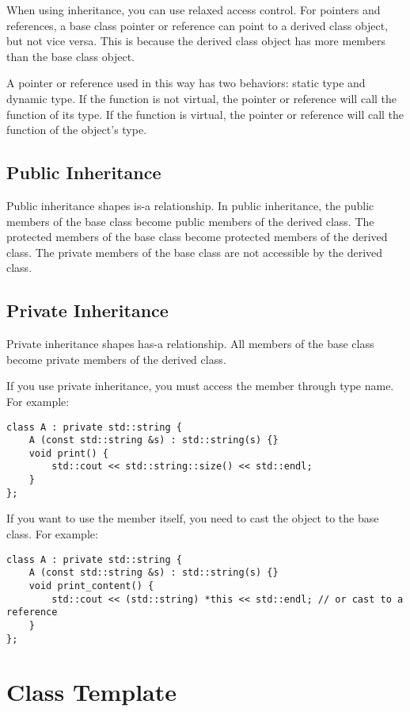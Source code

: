 \documentclass[a4paper,12pt]{article}
\begin{document}
When using inheritance, you can use relaxed access control.
For pointers and references, a base class pointer or reference can point to a derived class object, but not vice versa.
This is because the derived class object has more members than the base class object.

A pointer or reference used in this way has two behaviors: static type and dynamic type.
If the function is not virtual, the pointer or reference will call the function of its type.
If the function is virtual, the pointer or reference will call the function of the object's type.

\subsection{Public Inheritance}

Public inheritance shapes is-a relationship.
In public inheritance, the public members of the base class become public members of the derived class.
The protected members of the base class become protected members of the derived class.
The private members of the base class are not accessible by the derived class.

\subsection{Private Inheritance}

Private inheritance shapes has-a relationship.
All members of the base class become private members of the derived class.

If you use private inheritance, you must access the member through type name.
For example:
\begin{verbatim}
class A : private std::string {
    A (const std::string &s) : std::string(s) {}
    void print() {
        std::cout << std::string::size() << std::endl;
    }
};
\end{verbatim}

If you want to use the member itself, you need to cast the object to the base class.
For example:
\begin{verbatim}
class A : private std::string {
    A (const std::string &s) : std::string(s) {}
    void print_content() {
        std::cout << (std::string) *this << std::endl; // or cast to a reference
    }
};
\end{verbatim}

\section{Class Template}
\end{document}
